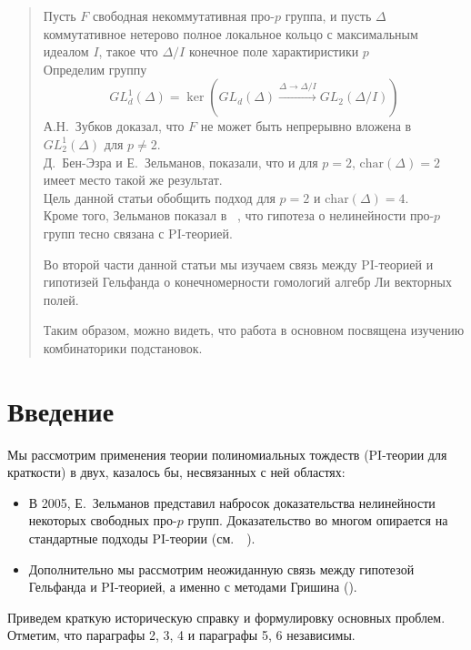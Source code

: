 \documentclass[12pt,a4paper]{article}
\begin{document}


    \begin{abstract}
        Пусть $F$ свободная некоммутативная про-$p$ группа, и пусть $\Delta$ коммутативное нетерово полное локальное кольцо с максимальным идеалом $I$, такое что
        $\Delta/I$ конечное поле характиристики $p$\\
        Определим группу
        \[GL_d^1(\Delta) = \ker\left( GL_d(\Delta) \xrightarrow{\Delta\to\Delta/I} GL_2(\Delta/I) \right)\]
        А.Н.\ Зубков доказал, что $F$ не может быть непрерывно вложена в $GL_2^1(\Delta)$ для $p\neq2$.\\
        Д.\ Бен-Эзра и Е.\ Зельманов, показали, что и для $p=2$, $\mathrm{char}(\Delta)=2$ имеет место такой же результат.\\
        Цель данной статьи обобщить подход для $p=2$ и $\mathrm{char}(\Delta)=4$.\\
        Кроме того, Зельманов показал в ~\cite{Zelmanov1}, что гипотеза о нелинейности про-$p$ групп тесно связана с PI-теорией.

        Во второй части данной статьи мы изучаем связь между PI-теорией и гипотизей Гельфанда о конечномерности гомологий алгебр Ли векторных полей.

        Таким образом, можно видеть, что работа в основном посвящена изучению комбинаторики подстановок.
    \end{abstract}
    \tableofcontents


    \section{Введение}
    Мы рассмотрим применения теории полиномиальных тождеств (PI-теории для краткости) в двух, казалось бы, несвязанных с ней областях:
    \begin{itemize}
        \item В 2005, Е.\ Зельманов представил набросок доказательства нелинейности некоторых свободных про-$p$ групп.
        Доказательство во многом опирается на стандартные подходы PI-теории (см.\ ~\cite{Zelmanov1}).
        \item Дополнительно мы рассмотрим неожиданную связь между гипотезой Гельфанда и PI-теорией, а именно с методами Гришина (\cite{Grishin}).
    \end{itemize}

    Приведем краткую историческую справку и формулировку основных проблем.
    Отметим, что параграфы 2, 3, 4 и параграфы 5, 6 независимы.
\end{document}

